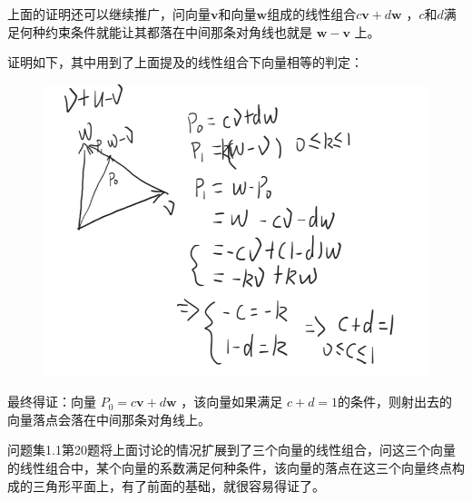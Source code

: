 \documentclass[12pt,oneside]{book}
\begin{document}
上面的证明还可以继续推广，问向量$\boldsymbol{v}$和向量$\boldsymbol{w}$组成的线性组合$c\boldsymbol{v} + d\boldsymbol{w}$ ，$c$和$d$满足何种约束条件就能让其都落在中间那条对角线也就是 $\boldsymbol{w} - \boldsymbol{v}$ 上。

证明如下，其中用到了上面提及的线性组合下向量相等的判定：

\begin{figure}[H]
\centering
\includegraphics[width=\linewidth ,totalheight=0.95\textheight , keepaspectratio]{线性代数引论问题集1_1_15_2.png}
\end{figure}

最终得证：向量 $P_0 = c\boldsymbol{v}+d\boldsymbol{w}$ ，该向量如果满足 $c+d=1$的条件，则射出去的向量落点会落在中间那条对角线上。


\cite{线性代数引论}问题集1.1第20题将上面讨论的情况扩展到了三个向量的线性组合，问这三个向量的线性组合中，某个向量的系数满足何种条件，该向量的落点在这三个向量终点构成的三角形平面上，有了前面的基础，就很容易得证了。
\end{document}
